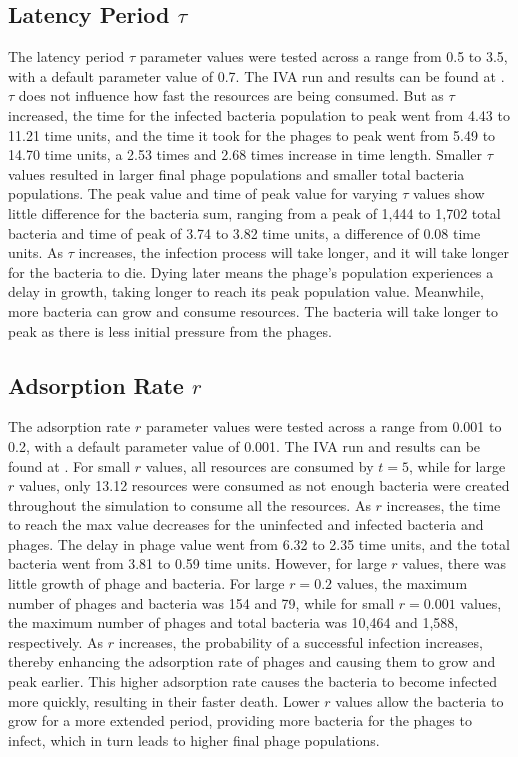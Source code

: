 \subsection{Latency Period $\tau$}
The latency period $\tau$ parameter values were tested across a range from 0.5 to 3.5, with a default parameter value of 0.7. 
The IVA run and results can be found at . 
$\tau$ does not influence how fast the resources are being consumed. 
But as $\tau$ increased, the time for the infected bacteria population to peak went from 4.43 to 11.21 time units, and the time it took for the phages to peak went from 5.49 to 14.70 time units, a 2.53 times and 2.68 times increase in time length. 
Smaller $\tau$ values resulted in larger final phage populations and smaller total bacteria populations. 
The peak value and time of peak value for varying $\tau$ values show little difference for the bacteria sum, ranging from a peak of 1,444 to 1,702 total bacteria and time of peak of 3.74 to 3.82 time units, a difference of 0.08 time units. 
As $\tau$ increases, the infection process will take longer, and it will take longer for the bacteria to die. 
Dying later means the phage's population experiences a delay in growth, taking longer to reach its peak population value. 
Meanwhile, more bacteria can grow and consume resources. 
The bacteria will take longer to peak as there is less initial pressure from the phages. 

\subsection{Adsorption Rate $r$}
The adsorption rate $r$ parameter values were tested across a range from 0.001 to 0.2, with a default parameter value of 0.001. 
The IVA run and results can be found at . 
For small $r$ values, all resources are consumed by $t=5$, while for large $r$ values, only 13.12 resources were consumed as not enough bacteria were created throughout the simulation to consume all the resources. 
As $r$ increases, the time to reach the max value decreases for the uninfected and infected bacteria and phages. The delay in phage value went from 6.32 to 2.35 time units, and the total bacteria went from 3.81 to 0.59 time units. 
However, for large $r$ values, there was little growth of phage and bacteria. 
For large $r=0.2$ values, the maximum number of phages and bacteria was 154 and 79, while for small $r=0.001$ values, the maximum number of phages and total bacteria was 10,464 and 1,588, respectively. 
As $r$ increases, the probability of a successful infection increases, thereby enhancing the adsorption rate of phages and causing them to grow and peak earlier. 
This higher adsorption rate causes the bacteria to become infected more quickly, resulting in their faster death. 
Lower $r$ values allow the bacteria to grow for a more extended period, providing more bacteria for the phages to infect, which in turn leads to higher final phage populations.

